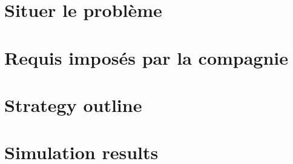 \label{sec:uav}

\section{Situer le problème}

\section{Requis imposés par la compagnie}

\section{Strategy outline}

\section{Simulation results}
